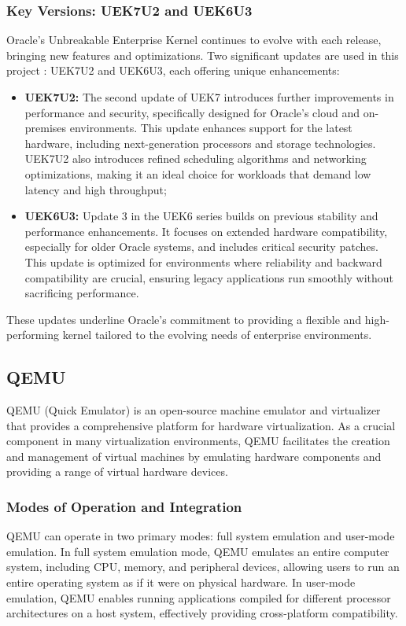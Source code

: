 \subsubsection[Key Versions: UEK7U2 and UEK6U3]{Key Versions: UEK7U2 and UEK6U3}
Oracle's Unbreakable Enterprise Kernel continues to evolve with each release, bringing new features and optimizations. Two significant updates are used in this project : UEK7U2 and UEK6U3, each offering unique enhancements:
\begin{itemize}
    \item \textbf{UEK7U2:} The second update of UEK7 introduces further improvements in performance and security, specifically designed for Oracle's cloud and on-premises environments. This update enhances support for the latest hardware, including next-generation processors and storage technologies. UEK7U2 also introduces refined scheduling algorithms and networking optimizations, making it an ideal choice for workloads that demand low latency and high throughput;
    \item \textbf{UEK6U3:} Update 3 in the UEK6 series builds on previous stability and performance enhancements. It focuses on extended hardware compatibility, especially for older Oracle systems, and includes critical security patches. This update is optimized for environments where reliability and backward compatibility are crucial, ensuring legacy applications run smoothly without sacrificing performance.
\end{itemize}

These updates underline Oracle's commitment to providing a flexible and high-performing kernel tailored to the evolving needs of enterprise environments.

\subsection{QEMU}
QEMU (Quick Emulator) is an open-source machine emulator and virtualizer that provides a comprehensive platform for hardware virtualization. As a crucial component in many virtualization environments, QEMU facilitates the creation and management of virtual machines by emulating hardware components and providing a range of virtual hardware devices.

\subsubsection[Modes of Operation and Integration]{Modes of Operation and Integration}
QEMU can operate in two primary modes: full system emulation and user-mode emulation. In full system emulation mode, QEMU emulates an entire computer system, including CPU, memory, and peripheral devices, allowing users to run an entire operating system as if it were on physical hardware. In user-mode emulation, QEMU enables running applications compiled for different processor architectures on a host system, effectively providing cross-platform compatibility.\mynewline

